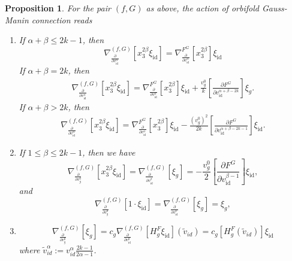 \documentclass[reqno,12pt]{amsart}
\numberwithin{equation}{section}
\theoremstyle{plain}
\newtheorem{proposition}[theorem]{Proposition}
\def\p{\partial }
\theoremstyle{definition}
\newcommand{\id}{\mathrm{id}}
\numberwithin{equation}{section}
\begin{document}
\begin{proposition}{\label{EF3}}
    For the pair $(f,G)$ as above, the action of orbifold Gauss-Manin connection reads
\begin{enumerate}
\item 
If $\alpha+\beta \le 2k-1$, then
\[
\nabla_{\frac{\partial}{\partial v^\alpha_{\id}}}^{(f,G)}[x_3^{2\beta}\xi_{\id} ] = \nabla^{F^G}_{\frac{\partial}{\partial v^\alpha_{\id}}}[x_3^{2\beta}]\xi_{\id}
\]
If $\alpha+\beta = 2k$, then
\begin{gather*}
\nabla_{\frac{\partial}{\partial v^\alpha_{\id}}}^{(f,G)}[x_3^{2\beta}\xi_{\id} ]  =  \nabla^{F^G}_{\frac{\partial}{\partial v^\alpha_{\id}}}[x_3^{2\beta}]\xi_{\id} + \frac{v_g^0}{k}\left[\frac{\p F^G}{\p v_\id^{\alpha+\beta-2k}}\right] \xi_{g}.
\end{gather*}
If $\alpha+\beta > 2k$, then
\begin{gather*}
\nabla_{\frac{\partial}{\partial v^\alpha_{\id}}}^{(f,G)}[x_3^{2\beta}\xi_{\id} ]  =  \nabla^{F^G}_{\frac{\partial}{\partial v^\alpha_{\id}}}[x_3^{2\beta}]\xi_{\id} - \frac{(v_g^0)^2}{2k} 
\left[\frac{\p F^G}{\p v_\id^{\alpha+\beta-2k-1}}\right]\xi_{\id}.
\end{gather*}
\item If $1 \le \beta \le 2k-1$, then we have
\[
\nabla_{\frac{\partial}{\partial v^0_{g}}}^{(f,G)}[x_3^{2\beta}\xi_{\id}] 
= \nabla_{\frac{\partial}{\partial v^\beta_{\id}}}^{(f,G)}[\xi_{g}] 
= - \frac{v_g^0}{2}\left[\frac{\partial F^G}{\partial v^{\beta-1}_{\id}}\right]\xi_{\id},
\]
and
\[
\nabla_{\frac{\partial}{\partial v^0_{g}}}^{(f,G)}[1 \cdot \xi_{\id}] 
= \nabla_{\frac{\partial}{\partial v^0_{\id}}}^{(f,G)}[\xi_{g}] 
= \xi_g,
\]

\item \[
        \nabla_{\frac{\partial}{\partial v^0_{g}}}^{(f,G)}[\xi_{g}] = 
        c_g \nabla_{\frac{\partial}{\partial v^0_{\id}}}^{(f,G)}[H^F_g \xi_{\id}](\widetilde v_{id}) = c_g[H^F_g (\widetilde v_{id})]\xi_{\id}
    \]
where $\widetilde v^{\alpha}_{id} := v^{\alpha}_{id} \frac{2k - 1}{2\alpha -1}$.  
\end{enumerate}
\end{proposition}
\end{document}
